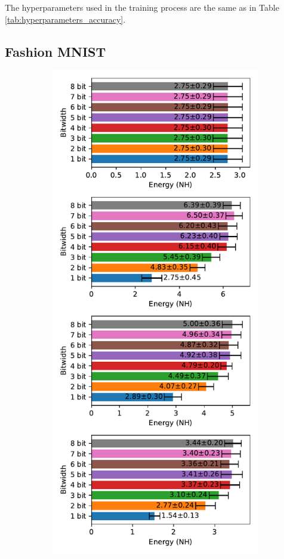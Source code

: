     The hyperparameters used in the training process are the same as in Table \ref{tab:hyperparameters_accuracy}.

    \subsection{Fashion MNIST}
    \label{appendix:energy_neuromorphic_fashion_mnist}

        \begin{figure}[H]
            \centering
            \begin{subfigure}[H]{0.495\textwidth}
                \includegraphics[width=\textwidth]{../standard/FashionMNIST/plots/fashionmnist_test_energy_nh.pdf}

\end{subfigure}
\end{figure}
